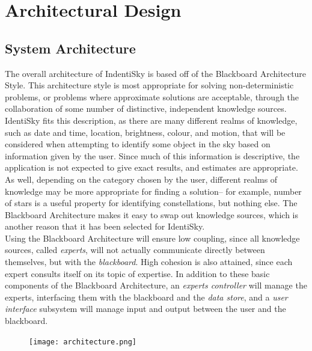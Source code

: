 \documentclass[]{article}
\begin{document}
\section{Architectural Design}
\label{sec:architectural_design}

\subsection{System Architecture}
\label{sub:system_architecture}

The overall architecture of IndentiSky is based off of the Blackboard Architecture Style. This architecture style is most appropriate for solving non-deterministic problems, or problems where approximate solutions are acceptable, through the collaboration of some number of distinctive, independent knowledge sources. IdentiSky fits this description, as there are many different realms of knowledge, such as date and time, location, brightness, colour, and motion, that will be considered when attempting to identify some object in the sky based on information given by the user. Since much of this information is descriptive, the application is not expected to give exact results, and estimates are appropriate. As well, depending on the category chosen by the user, different realms of knowledge may be more appropriate for finding a solution-- for example, number of stars is a useful property for identifying constellations, but nothing else. The Blackboard Architecture makes it easy to swap out knowledge sources, which is another reason that it has been selected for IdentiSky. \\

Using the Blackboard Architecture will ensure low coupling, since all knowledge sources, called \emph{experts}, will not actually communicate directly between themselves, but with the \emph{blackboard}. High cohesion is also attained, since each expert consults itself on its topic of expertise. In addition to these basic components of the Blackboard Architecture, an \emph{experts controller} will manage the experts, interfacing them with the blackboard and the \emph{data store}, and a \emph{user interface} subsystem will manage input and output between the user and the blackboard.

\begin{figure}[h!]
    \centering
    \texttt{[image: architecture.png]}
\end{figure}
\end{document}
